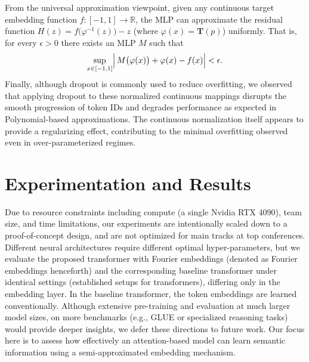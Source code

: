 \documentclass{article}
\begin{document}
From the universal approximation viewpoint, given any continuous target embedding function \(f: [-1,1] \to \mathbb{R}\), the MLP can approximate the residual function \(H(z)=f\bigl(\varphi^{-1}(z)\bigr)-z\) (where \(\varphi(x)=\mathbf{T}(p)\)) uniformly. That is, for every \(\epsilon>0\) there exists an MLP \(M\) such that
\[
\sup_{x \in [-1, 1]} \Bigl|\, M\bigl(\varphi(x)\bigr) + \varphi(x) - f(x) \Bigr| < \epsilon.
\]
Finally, although dropout is commonly used to reduce overfitting, we observed that applying dropout to these normalized continuous mappings disrupts the smooth progression of token IDs and degrades performance as expected in Polynomial-based approximations. The continuous normalization itself appears to provide a regularizing effect, contributing to the minimal overfitting observed even in over-parameterized regimes.
\section{Experimentation and Results}
Due to resource constraints including compute (a single Nvidia RTX 4090), team size, and time limitations, our experiments are intentionally scaled down to a proof-of-concept design, and are not optimized for main tracks at top conferences. Different neural architectures require different optimal hyper-parameters, but we evaluate the proposed transformer with Fourier embeddings (denoted as Fourier embeddings henceforth) and the corresponding baseline transformer under identical settings (established setups for transformers), differing only in the embedding layer. In the baseline transformer, the token embeddings are learned conventionally. Although extensive pre-training and evaluation at much larger model sizes, on more benchmarks (e.g., GLUE or specialized reasoning tasks) would provide deeper insights, we defer these directions to future work. Our focus here is to assess how effectively an attention-based model can learn semantic information using a semi-approximated embedding mechanism.
\end{document}
